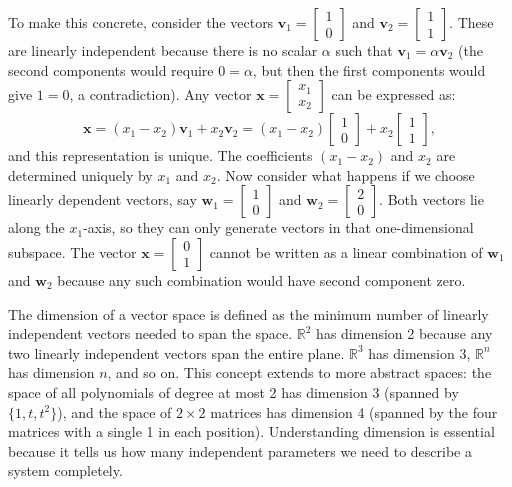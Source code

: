 To make this concrete, consider the vectors $\mathbf{v}_1 = \begin{bmatrix} 1 \\ 0 \end{bmatrix}$ and $\mathbf{v}_2 = \begin{bmatrix} 1 \\ 1 \end{bmatrix}$. These are linearly independent because there is no scalar $\alpha$ such that $\mathbf{v}_1 = \alpha\mathbf{v}_2$ (the second components would require $0 = \alpha$, but then the first components would give $1 = 0$, a contradiction). Any vector $\mathbf{x} = \begin{bmatrix} x_1 \\ x_2 \end{bmatrix}$ can be expressed as:
\[
\mathbf{x} = (x_1 - x_2)\mathbf{v}_1 + x_2\mathbf{v}_2 = (x_1 - x_2)\begin{bmatrix} 1 \\ 0 \end{bmatrix} + x_2\begin{bmatrix} 1 \\ 1 \end{bmatrix},
\]
and this representation is unique. The coefficients $(x_1 - x_2)$ and $x_2$ are determined uniquely by $x_1$ and $x_2$. Now consider what happens if we choose linearly dependent vectors, say $\mathbf{w}_1 = \begin{bmatrix} 1 \\ 0 \end{bmatrix}$ and $\mathbf{w}_2 = \begin{bmatrix} 2 \\ 0 \end{bmatrix}$. Both vectors lie along the $x_1$-axis, so they can only generate vectors in that one-dimensional subspace. The vector $\mathbf{x} = \begin{bmatrix} 0 \\ 1 \end{bmatrix}$ cannot be written as a linear combination of $\mathbf{w}_1$ and $\mathbf{w}_2$ because any such combination would have second component zero.

The dimension of a vector space is defined as the minimum number of linearly independent vectors needed to span the space. $\mathbb{R}^2$ has dimension 2 because any two linearly independent vectors span the entire plane. $\mathbb{R}^3$ has dimension 3, $\mathbb{R}^n$ has dimension $n$, and so on. This concept extends to more abstract spaces: the space of all polynomials of degree at most 2 has dimension 3 (spanned by $\{1, t, t^2\}$), and the space of $2 \times 2$ matrices has dimension 4 (spanned by the four matrices with a single 1 in each position). Understanding dimension is essential because it tells us how many independent parameters we need to describe a system completely.

